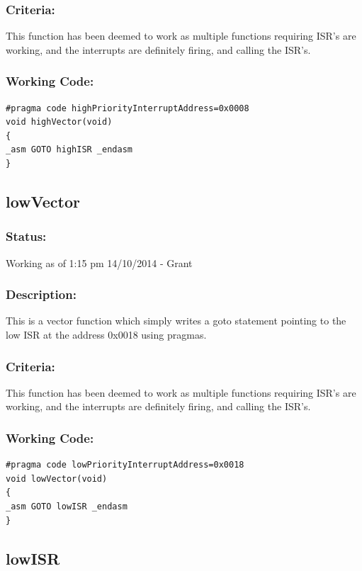 \documentclass[]{report}
\begin{document}
\subsubsection{Criteria:}
This function has been deemed to work as multiple functions requiring ISR's are working, and the interrupts are definitely firing, and calling the ISR's.

\subsubsection{Working Code:}
\begin{lstlisting}
#pragma code highPriorityInterruptAddress=0x0008
void highVector(void)
{
_asm GOTO highISR _endasm
}
\end{lstlisting}

\subsection{lowVector}
\subsubsection{Status:}
Working as of 1:15 pm 14/10/2014 - Grant

\subsubsection{Description:}
This is a vector function which simply writes a goto statement pointing to the low ISR at the address 0x0018 using pragmas.

\subsubsection{Criteria:}
This function has been deemed to work as multiple functions requiring ISR's are working, and the interrupts are definitely firing, and calling the ISR's.

\subsubsection{Working Code:}
\begin{lstlisting}
#pragma code lowPriorityInterruptAddress=0x0018
void lowVector(void)
{
_asm GOTO lowISR _endasm
}
\end{lstlisting}

\subsection{lowISR}
\end{document}
